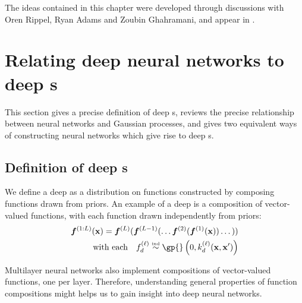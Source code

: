 The ideas contained in this chapter were developed through discussions with Oren Rippel, Ryan Adams and Zoubin Ghahramani, and appear in \citet{DuvRipAdaGha14}.




\section{Relating deep neural networks to deep \sgp{}s}
\label{sec:relating}

This section gives a precise definition of deep \gp{}s, reviews the precise relationship between neural networks and Gaussian processes, and gives two equivalent ways of constructing neural networks which give rise to deep \gp{}s.



\subsection{Definition of deep \sgp{}s}

We define a deep \gp{} as a distribution on functions constructed by composing functions drawn from \gp{} priors.
An example of a deep \gp{} is a composition of vector-valued functions, with each function drawn independently from \gp{} priors:
%
\begin{align}
\vf^{(1:L)}(\vx) = \vf^{(L)}(\vf^{(L-1)}(\dots \vf^{(2)}(\vf^{(1)}(\vx)) \dots)) \\
\textnormal{with each} \quad f_d^{(\layerindex)}  \simind \gp{} \left( 0, k^{(\layerindex)}_d(\vx, \vx') \right) \nonumber
\label{eq:deep-gp}
\end{align}
%

Multilayer neural networks also implement compositions of vector-valued functions, one per layer.
Therefore, understanding general properties of function compositions might helps us to gain insight into deep neural networks.


